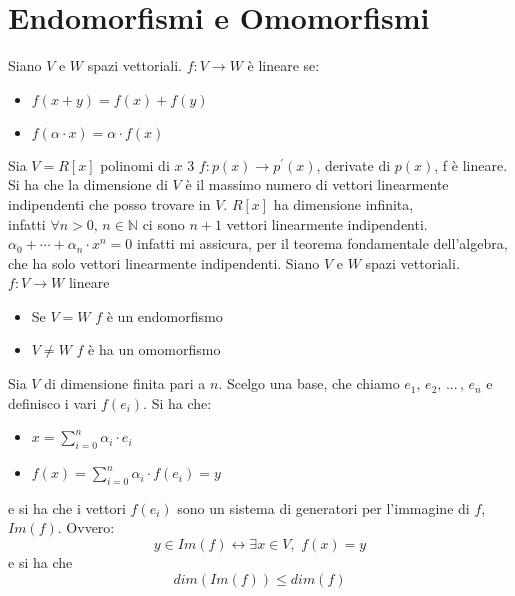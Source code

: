 \documentclass[a4paper,12pt, oneside]{book}
\begin{document}
	\section{Endomorfismi e Omomorfismi}
	Siano $V$ e $W$ spazi vettoriali. $f:V\rightarrow W $ è lineare se:
	\begin{itemize}
		\item $f(x+y)=f(x)+f(y)$
		\item $f(\alpha\cdot x)=\alpha\cdot f(x)$
	\end{itemize}
	Sia $V=R[x]$ polinomi di $x$ 3 $f:p(x)\rightarrow p^{'}(x)$, derivate di $p(x)$, f è lineare. Si ha che la dimensione di $V$ è il massimo numero di vettori linearmente indipendenti che posso trovare in $V$. $R[x]$ ha dimensione infinita, \\infatti $\forall n>0, \, n\in \mathbb{N}$ ci sono $n+1$ vettori linearmente indipendenti. $\alpha_0+\cdots+\alpha_n\cdot x^n=0$ infatti mi assicura, per il teorema fondamentale dell'algebra, che ha solo vettori linearmente indipendenti.
	Siano $V$ e $W$ spazi vettoriali. $f:V\rightarrow W $ lineare
	\begin{itemize}
		\item Se $V=W$ $f$ è un endomorfismo
		\item $V\neq W$ $f$ è ha un omomorfismo
	\end{itemize}
	Sia $V$ di dimensione finita pari a $n$. Scelgo una base, che chiamo $e_1,\, e_2,\, ... \,,\, e_n$ e definisco i vari $f(e_i)$. Si ha che:
	\begin{itemize}
		\item $x=\sum_{i=0}^n \alpha_i \cdot e_i$
		\item $f(x)=\sum_{i=0}^n \alpha_i \cdot f(e_i)=y$
	\end{itemize}
	e si ha che i vettori $f(e_i)$ sono un sistema di generatori per l'immagine di $f$, $Im(f)$. Ovvero:
$$y\in Im(f) \longleftrightarrow \exists x\in V ,\,\, f(x)=y$$
e si ha che $$dim(Im(f))\leq dim(f)$$
\end{document}
